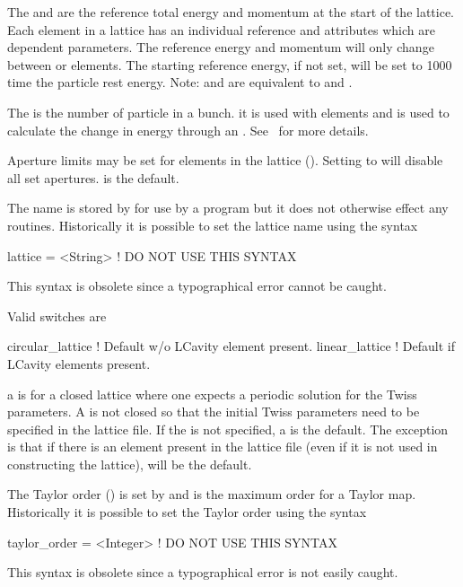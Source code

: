 The  and  are the reference
total energy and momentum at the start of the lattice.  Each element
in a lattice has an individual reference  and  attributes
which are dependent parameters. The reference energy and momentum will only
change between  or  elements. The starting
reference energy, if not set, will be set to 1000 time the particle
rest energy.  Note:  and  are
equivalent to  and .

The  is the number of particle in a bunch.
it is used with  elements and is used to calculate the
change in energy through an . See~ for more
details.

Aperture limits may be set for elements in the lattice
(). Setting  to  will
disable all set apertures.  is the default.

The  name is stored by \bmad for use by a program but it does
not otherwise effect any \bmad routines. 
Historically it is possible to set the lattice name using the syntax
\begin{example}
  lattice = <String>   ! DO NOT USE THIS SYNTAX
\end{example}
This syntax is obsolete since a typographical error cannot be caught.

\noindent
{}
Valid  switches are
\begin{example}
  circular_lattice  ! Default w/o LCavity element present.
  linear_lattice    ! Default if LCavity elements present.
\end{example}
a  is for a closed lattice where one expects a
periodic solution for the Twiss parameters. A  is
not closed so that the initial Twiss parameters need to be specified
in the lattice file. If the  is not specified, a
 is the default. The exception is that if there
is an  element present in the lattice file (even if it is
not used in constructing the lattice),  will be the
default.

The Taylor order () is set by
 and is the maximum order for a Taylor map.
Historically it is possible to set the Taylor order using the syntax
\begin{example}
  taylor_order = <Integer>   ! DO NOT USE THIS SYNTAX
\end{example}
This syntax is obsolete since a typographical error is not easily caught.

